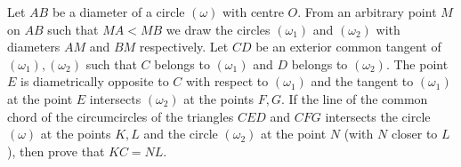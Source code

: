 Let $AB$ be a diameter of a circle $(\omega)$  with centre $O$. From an arbitrary point $M$ on $AB$ such that $MA < MB$ we draw the circles $(\omega_1)$ and $(\omega_2)$ with diameters $AM$ and $BM$ respectively. Let $CD$ be an exterior common tangent of $(\omega_1), (\omega_2)$ such that $C$ belongs to $(\omega_1)$ and $D$ belongs to $(\omega_2)$. The point $E$ is diametrically opposite to $C$ with respect to $(\omega_1)$ and the tangent to $(\omega_1)$ at the point $E$ intersects $(\omega_2)$ at the points $F, G$. If the line of the common chord of the circumcircles of the triangles $CED$ and $CFG$ intersects the circle $(\omega)$ at the points $K, L$ and the circle $(\omega_2)$ at the point $N$ (with $N$ closer to $L$), then prove that $KC = NL$.
